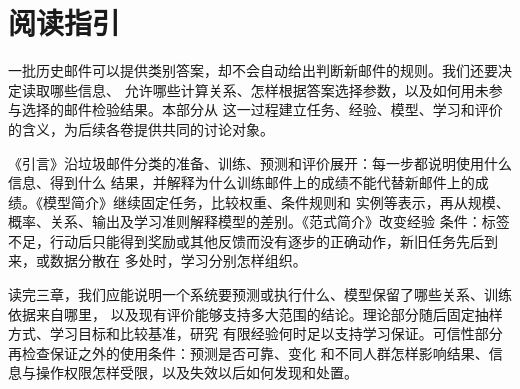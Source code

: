 \chapter*{阅读指引}

一批历史邮件可以提供类别答案，却不会自动给出判断新邮件的规则。我们还要决定读取哪些信息、
允许哪些计算关系、怎样根据答案选择参数，以及如何用未参与选择的邮件检验结果。本部分从
这一过程建立任务、经验、模型、学习和评价的含义，为后续各卷提供共同的讨论对象。

《引言》沿垃圾邮件分类的准备、训练、预测和评价展开：每一步都说明使用什么信息、得到什么
结果，并解释为什么训练邮件上的成绩不能代替新邮件上的成绩。《模型简介》继续固定任务，比较权重、条件规则和
实例等表示，再从规模、概率、关系、输出及学习准则解释模型的差别。《范式简介》改变经验
条件：标签不足，行动后只能得到奖励或其他反馈而没有逐步的正确动作，新旧任务先后到来，或数据分散在
多处时，学习分别怎样组织。

读完三章，我们应能说明一个系统要预测或执行什么、模型保留了哪些关系、训练依据来自哪里，
以及现有评价能够支持多大范围的结论。理论部分随后固定抽样方式、学习目标和比较基准，研究
有限经验何时足以支持学习保证。可信性部分再检查保证之外的使用条件：预测是否可靠、变化
和不同人群怎样影响结果、信息与操作权限怎样受限，以及失效以后如何发现和处置。
